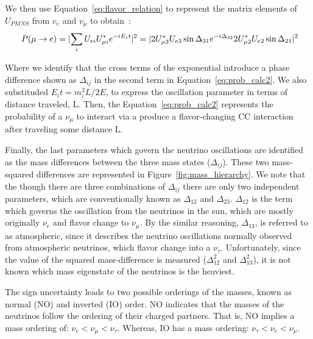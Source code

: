We then use Equation~\ref{eq:flavor_relation} to represent the matrix elements of $U_{PMNS}$ from $v_{e}$ and $v_{\mu}$  to obtain~\citep{Nunokawa_2008}:
\begin{equation}~\label{eq:prob_calc2}
  P(\mu \rightarrow e)
  = \lvert \sum_{i} U_{e i} U^{*}_{\mu i} e^{-i E_{i}t} \rvert^{2} \\
  = \lvert 2U^{*}_{\mu 3}U_{e3}\sin \Delta_{31}e^{-i\Delta_{32}} 2U^{*}_{\mu 2}U_{e2}\sin \Delta_{21} \rvert^{2}
\end{equation}

Where we identify that the cross terms of the exponential introduce a phase difference shown as $\Delta_{ij}$ in the second term in Equation~\ref{eq:prob_calc2}.
We also substituded $E_{i}t = m^{2}_{i}L/2E$, to express the oscillation parameter in terms of distance traveled, L.
Then, the Equation~\ref{eq:prob_calc2} represents the probability of a $\nu_{\mu}$ to interact via a produce a flavor-changing CC interaction after traveling some distance L.

Finally, the last parameters which govern the neutrino oscillations are identified as the mass differences between the three mass states ($\Delta_{ij}$).
These two mass-squared differences are represented in Figure~\ref{fig:mass_hierarchy}.
We note that the though there are three combinations of $\Delta_{ij}$ there are only two independent parameters, which are conventionally known as $\Delta_{12}$ and $\Delta_{23}$.
$\Delta_{12}$ is the term which governs the oscillation from the neutrinos in the sun, which are mostly originally $\nu_{e}$ and flavor change to $\nu_{\mu}$.
By the similar reasoning, $\Delta_{13}$, is referred to as atmospheric, since it describes the neutrino oscillations normally observed from atmospheric neutrinos, which flavor change into a $\nu_{\tau}$.
Unfortunately, since the value of the squared mass-difference is measured ($\Delta_{12}^{2}$ and $\Delta_{13}^{2}$), it is not known which mass eigenstate of the neutrinos is the heaviest.

The sign uncertainty leads to two possible orderings of the masses, known as normal (NO) and inverted (IO) order.
NO indicates that the masses of the neutrinos follow the ordering of their charged partners.
That is, NO implies a mass ordering of: $\nu_{e} < \nu_{\mu} < \nu_{\tau}$.
Whereas, IO has a mass ordering: $\nu_{\tau} < \nu_{e} < \nu_{\mu}$.


